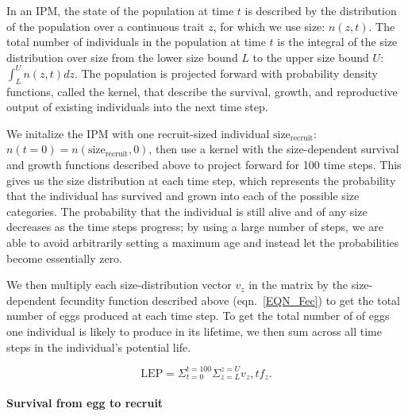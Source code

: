 \documentclass[12pt, oneside]{article}   	%
\begin{document}
In an IPM, the state of the population at time $t$ is described by the distribution of the population over a continuous trait $z$, for which we use size: $n(z,t)$. The total number of individuals in the population at time $t$ is the integral of the size distribution over size from the lower size bound $L$ to the upper size bound $U$: $\int_L^U n(z,t) dz$. The population is projected forward with probability density functions, called the kernel, that describe the survival, growth, and reproductive output of existing individuals into the next time step. 

We initalize the IPM with one recruit-sized individual $\text{size}_\text{recruit}$: $n(t=0) = n(\text{size}_\text{recruit}, 0)$, then use a kernel with the size-dependent survival and growth functions described above to project forward for 100 time steps. This gives us the size distribution at each time step, which represents the probability that the individual has survived and grown into each of the possible size categories. The probability that the individual is still alive and of any size decreases as the time steps progress; by using a large number of steps, we are able to avoid arbitrarily setting a maximum age and instead let the probabilities become essentially zero. 

We then multiply each size-distribution vector $v_z$ in the matrix by the size-dependent fecundity function described above (eqn.\ \ref{EQN_Fec}) to get the total number of eggs produced at each time step. To get the total number of of eggs one individual is likely to produce in its lifetime, we then sum across all time steps in the individual's potential life.  %

 
\begin{equation} %
\text{LEP} = \Sigma_{t=0}^{t=100} \Sigma_{z=L}^{z=U} v_z,t f_z. \label{EQN_LEP}
\end{equation}

\paragraph*{Survival from egg to recruit}
\end{document}
